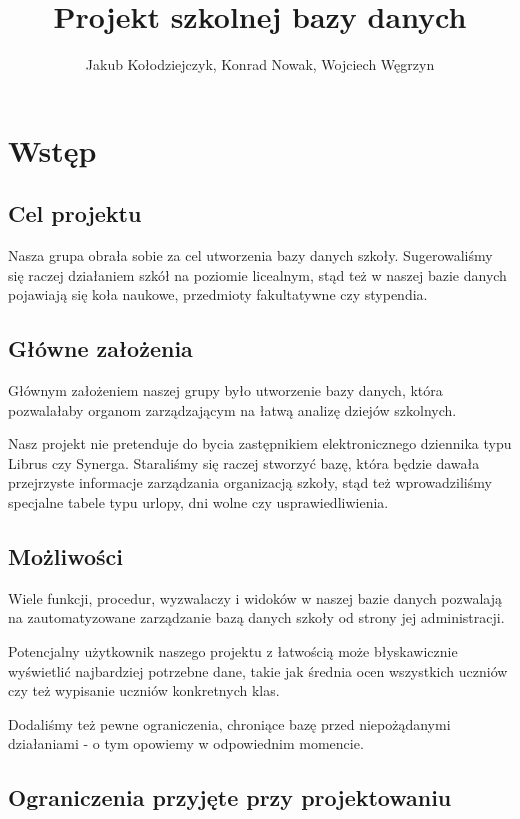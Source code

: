 \documentclass[60pt]{article}
\title{Projekt szkolnej bazy danych}
\author{Jakub Kołodziejczyk, Konrad Nowak, Wojciech Węgrzyn}
\begin{document}
\maketitle

\newpage
\tableofcontents

\newpage
\section{Wstęp}

\subsection{Cel projektu}

Nasza grupa obrała sobie za cel utworzenia bazy danych szkoły. Sugerowaliśmy się raczej działaniem szkół na poziomie licealnym, stąd też w naszej bazie danych pojawiają się koła naukowe, przedmioty fakultatywne czy stypendia. 

\subsection{Główne założenia}

Głównym założeniem naszej grupy było utworzenie bazy danych, która pozwalałaby organom zarządzającym na łatwą analizę dziejów szkolnych. 

Nasz projekt nie pretenduje do bycia zastępnikiem elektronicznego dziennika typu Librus czy Synerga. Staraliśmy się raczej stworzyć bazę, która będzie dawała przejrzyste informacje zarządzania organizacją szkoły, stąd też wprowadziliśmy specjalne tabele typu urlopy, dni wolne czy usprawiedliwienia. 

\subsection{Możliwości}

Wiele funkcji, procedur, wyzwalaczy i widoków w naszej bazie danych pozwalają na zautomatyzowane zarządzanie bazą danych szkoły od strony jej administracji. 

Potencjalny użytkownik naszego projektu z łatwością może błyskawicznie wyświetlić najbardziej potrzebne dane, takie jak średnia ocen wszystkich uczniów czy też wypisanie uczniów konkretnych klas. 

Dodaliśmy też pewne ograniczenia, chroniące bazę przed niepożądanymi działaniami - o tym opowiemy w odpowiednim momencie.

\subsection{Ograniczenia przyjęte przy projektowaniu}
\end{document}
